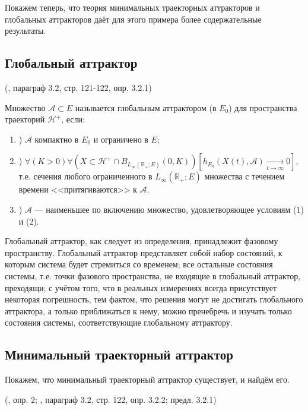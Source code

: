 Покажем теперь, что теория минимальных траекторных аттракторов и глобальных аттракторов
даёт для этого примера более содержательные результаты.


\subsection*{Глобальный аттрактор}

\opred (\cite{Zelenaya}, параграф 3.2, стр. 121-122, опр. 3.2.1)

Множество  $\mathcal{A} \subset E $ называется глобальным аттрактором (в $E_0$) для пространства траекторий $\mathcal{H}^+$, если:
\begin{enumerate}
	\item)
		$\mathcal{A}$ компактно в $E_0$ и ограничено в $E$;
	\item)
		$
			\forall(K>0)\forall(X \subset \mathcal{H}^+ \cap B_{L_{\infty}\left( \mathbb{R}_+; E \right)}(0,K))
				\left[
					h_{E_0}(X(t),\mathcal{A}) \xrightarrow[t\to \infty]{}{0}
				\right],
		$
		т.е. сечения любого ограниченного в $L_{\infty}\left( \mathbb{R}_+; E \right)$ множества
		с течением времени <<притягиваются>> к $\mathcal{A}$.
	\item)
		$\mathcal{A}$ --- наименьшее по включению множество, удовлетворяющее условиям (1) и (2).
\end{enumerate}


Глобальный аттрактор, как следует из определения, принадлежит фазовому пространству.
Глобальный аттрактор представляет собой набор состояний, к которым система будет стремиться со временем;
все остальные состояния системы, т.е. точки фазового пространства, не входящие в глобальный аттрактор, преходящи;
с учётом того, что в реальных измерениях всегда присутствует некоторая погрешность, тем фактом, что решения могут не достигать глобального аттрактора, а только приближаться к нему, можно пренебречь и изучать только состояния системы, соответствующие глобальному аттрактору.



\subsection*{Минимальный траекторный аттрактор}

Покажем, что минимальный траекторный аттрактор существует, и найдём его.

\opred (\cite{zhidkosti_s_pamyatyu}, опр. 2; \cite{Zelenaya}, параграф 3.2, стр. 122, опр. 3.2.2; предл. 3.2.1)

